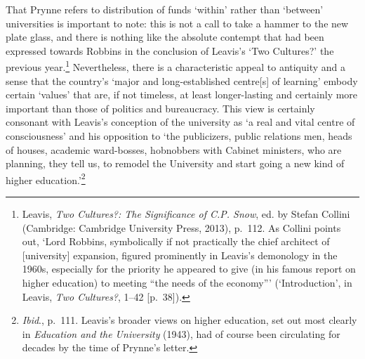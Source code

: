 \documentclass[]{article}
\begin{document}
\noindent That Prynne refers to distribution of funds ‘within’ rather
than ‘between’ universities is important to note: this is not a call to
take a hammer to the new plate glass, and there is nothing like the
absolute contempt that had been expressed towards Robbins in the
conclusion of Leavis’s ‘Two Cultures?’ the previous year.\footnote{Leavis,
  \emph{Two Cultures?: The Significance of C.P. Snow}, ed. by Stefan
  Collini (Cambridge: Cambridge University Press, 2013), p.~112. As
  Collini points out, ‘Lord Robbins, symbolically if not practically the
  chief architect of {[}university{]} expansion, figured prominently in
  Leavis’s demonology in the 1960s, especially for the priority he
  appeared to give (in his famous report on higher education) to meeting
  “the needs of the economy”’ (‘Introduction’, in Leavis, \emph{Two
  Cultures?}, 1–42 {[}p.~38{]}).} Nevertheless, there is a
characteristic appeal to antiquity and a sense that the country’s ‘major
and long-established centre{[}s{]} of learning’ embody certain ‘values’
that are, if not timeless, at least longer-lasting and certainly more
important than those of politics and bureaucracy. This view is certainly
consonant with Leavis’s conception of the university as ‘a real and
vital centre of consciousness’ and his opposition to ‘the publicizers,
public relations men, heads of houses, academic ward-bosses, hobnobbers
with Cabinet ministers, who are planning, they tell us, to remodel the
University and start going a new kind of higher education.’\footnote{\emph{Ibid}.,
  p.~111. Leavis’s broader views on higher education, set out most
  clearly in \emph{Education and the University} (1943), had of course
  been circulating for decades by the time of Prynne’s letter.}
\end{document}
